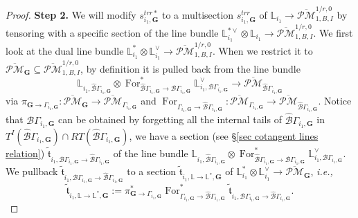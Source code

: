 \documentclass[11pt]{amsart}
\theoremstyle{definition}
\theoremstyle{remark}
\newcommand{\oPMb}{{\overline{\mathcal{PM}}}}
\newcommand{\nontilde}{}
\newcommand{\<}{\left<}
\renewcommand{\>}{\right>}
\numberwithin{equation}{section}
\begin{document}
\begin{proof}
    \noindent \textbf{Step 2.}
        We will modify $\nontilde{s}^{trr*}_{i_1,\mathbf{G}}$ to a  multisection $\nontilde{s}^{trr}_{i_1,\mathbf{G}}$  of $\mathbb L_{i_1}\to \oPMb^{1/r,0}_{1,B,I}$ by tensoring with a specific section of the line bundle $\mathbb L_{i_1}^{*\vee}\otimes \mathbb L_{i_1} \to \oPMb^{1/r,0}_{1,B,I}$.
         We first look at the dual line bundle $\mathbb L_{i_1}^*\otimes \mathbb L_{i_1}^\vee \to \oPMb^{1/r,0}_{1,B,I}$. When we restrict it to $\oPMb_{\mathbf{G}}\subseteq \oPMb^{1/r,0}_{1,B,I}$, by definition it is pulled back from the line bundle 
        $$\mathbb L_{i_1,\hat{\mathcal B}\Gamma_{i_1,\bm{G}}}\otimes \operatorname{For}^*_{\hat{\mathcal B}\Gamma_{i_1,\bm{G}}\to {\mathcal B}\Gamma_{i_1,\bm{G}}}\mathbb L_{i_1,{\mathcal B}\Gamma_{i_1,\bm{G}}}^\vee\to \oPMb_{\hat{\mathcal B}\Gamma_{i_1,\bm{G}}} $$ %
via $\pi_{\mathbf{G}\to \Gamma_{i_1,\mathbf{G}}}\colon \oPMb_{\mathbf{G}}\to \oPMb_{\Gamma_{i_1,\mathbf{G}}}$ 
        and        $\operatorname{For}_{\Gamma_{i_1,\bm{G}}\to\hat{\mathcal B}\Gamma_{i_1,\bm{G}}}\colon \oPMb_{\Gamma_{i_1,\bm{G}}}\to \oPMb_{\hat{\mathcal B}\Gamma_{i_1,\bm{G}}}$.  
        Notice %
that ${\mathcal B}\Gamma_{i_1,\bm{G}}$ can be obtained by forgetting all the internal tails of $\hat{\mathcal B}\Gamma_{i_1,\bm{G}}$ in $T^I(\hat{\mathcal B}\Gamma_{i_1,\bm{G}})\cap RT(\hat{\mathcal B}\Gamma_{i_1,\bm{G}})$, we have a section (see \S \ref{sec cotangent lines relation}) $\tilde{\mathfrak t}_{i_1,{\mathcal B}\Gamma_{i_1,\bm{G}}\to\hat{\mathcal B}\Gamma_{i_1,\bm{G}}}$ of the line bundle $\mathbb L_{i_1,\hat{\mathcal B}\Gamma_{i_1,\bm{G}}}\otimes \operatorname{For}^*_{\hat{\mathcal B}\Gamma_{i_1,\bm{G}}\to {\mathcal B}\Gamma_{i_1,\bm{G}}}\mathbb L_{i_1,{\mathcal B}\Gamma_{i_1,\bm{G}}}^\vee$. We %
pullback $\tilde{\mathfrak t}_{i_1,{\mathcal B}\Gamma_{i_1,\bm{G}}\to\hat{\mathcal B}\Gamma_{i_1,\bm{G}}}$  to %
a section $\tilde{\mathfrak{t}}_{i_1,\mathbb L \to \mathbb L^*,\mathbf{G}}$ of $\mathbb L_{i_1}^*\otimes \mathbb L_{i_1}^\vee \to \oPMb_{\mathbf{G}}$, \textit{i.e.,}
        $$
        \tilde{\mathfrak{t}}_{i_1,\mathbb L \to \mathbb L^*,\mathbf{G}}:=\pi^*_{\mathbf{G}\to \Gamma_{i_1,\mathbf{G}}}\operatorname{For}^*_{\Gamma_{i_1,\bm{G}}\to\hat{\mathcal B}\Gamma_{i_1,\bm{G}}}\tilde{\mathfrak t}_{i_1,{\mathcal B}\Gamma_{i_1,\bm{G}}\to\hat{\mathcal B}\Gamma_{i_1,\bm{G}}}.
$$
\end{proof}
\end{document}
